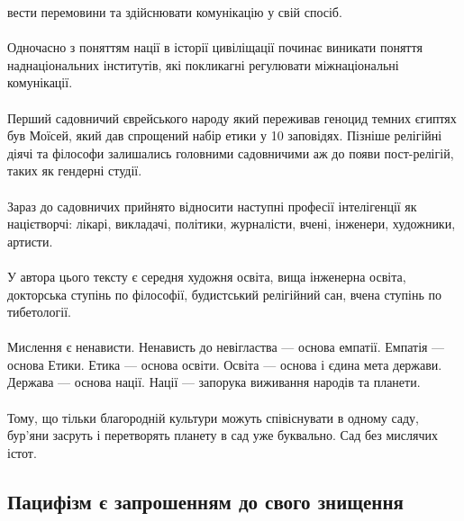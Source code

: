 вести перемовини та здійснювати комунікацію у свій спосіб.
\\
\\
Одночасно з поняттям нації в історії цивіліщації починає виникати поняття наднаціональних інститутів,
які покликагні регулювати міжнаціональні комунікації.
\\
\\
Перший садовничий єврейського народу який переживав геноцид темних єгиптях був Моїсей, який дав спрощений набір етики у 10 заповідях.
Пізніше релігійні діячі та філософи залишались головними садовничими аж до появи пост-релігій, таких як гендерні студії.
\\
\\
Зараз до садовничих прийнято відносити наступні професії інтелігенції як націєтворчі:
лікарі, викладачі, політики, журналісти, вчені, інженери, художники, артисти.
\\
\\
У автора цього тексту є середня художня освіта, вища інженерна освіта, докторська ступінь по філософії, будистський релігійний сан,
вчена ступінь по тибетології.
\\
\\
Мислення є ненависти. Ненависть до невігластва --- основа емпатії.
Емпатія --- основа Етики.
Етика --- основа освіти.
Освіта --- основа і єдина мета держави.
Держава --- основа нації.
Нації --- запорука виживання народів та планети.
\\
\\
Тому, що тільки благородній культури можуть співіснувати в одному саду, бур'яни засруть і перетворять
планету в сад уже буквально. Сад без мислячих істот.

\subsection{Пацифізм є запрошенням до свого знищення}

